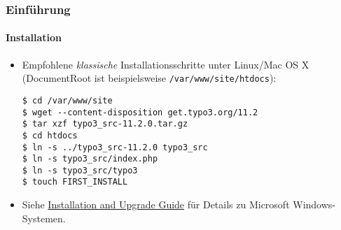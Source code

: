 %

\begin{frame}[fragile]
	\frametitle{Einführung}
	\framesubtitle{Installation}


	\begin{itemize}
		\item Empfohlene \textit{klassische} Installationsschritte unter Linux/Mac OS X\newline
			(DocumentRoot ist beispielsweise \texttt{/var/www/site/htdocs}):
\begin{lstlisting}
$ cd /var/www/site
$ wget --content-disposition get.typo3.org/11.2
$ tar xzf typo3_src-11.2.0.tar.gz
$ cd htdocs
$ ln -s ../typo3_src-11.2.0 typo3_src
$ ln -s typo3_src/index.php
$ ln -s typo3_src/typo3
$ touch FIRST_INSTALL
\end{lstlisting}

		\item Siehe \href{https://docs.typo3.org/m/typo3/guide-installation/master/en-us/}{Installation and Upgrade Guide}
			für Details zu Microsoft Windows-Systemen.

	\end{itemize}
\end{frame}

